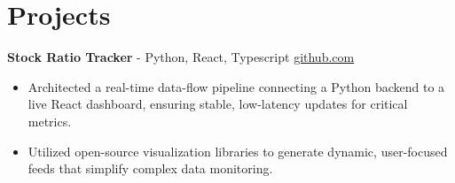 \documentclass[11pt]{article}       %
\begin{document}

\vspace{-18.5pt}

\section*{Projects}

\textbf{Stock Ratio Tracker}{ - Python, React, Typescript} \hfill \href{https://github.com/Monica20030707/tradingDashboard-UI}{github.com} \\
\vspace{-9pt}
\begin{itemize}
  \item Architected a real-time data-flow pipeline connecting a Python backend to a live React dashboard, ensuring stable, low-latency updates for critical metrics. 
  \item Utilized open-source visualization libraries to generate dynamic, user-focused feeds that simplify complex data monitoring.
\end{itemize}
\end{document}
